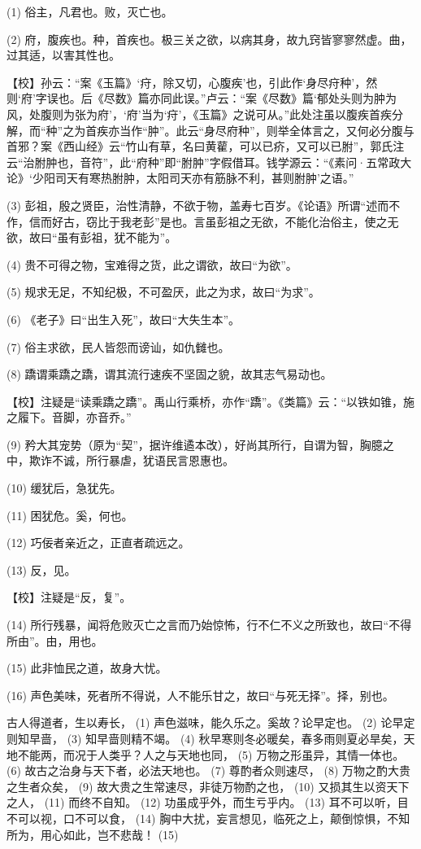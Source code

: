 \documentclass[12pt,UTF8]{ctexbook}
\begin{document}
(1) 俗主，凡君也。败，灭亡也。

(2) 府，腹疾也。种，首疾也。极三关之欲，以病其身，故九窍皆寥寥然虚。曲，过其适，以害其性也。

【校】孙云：“案《玉篇》‘疛，除又切，心腹疾’也，引此作‘身尽疛种’，然则‘府’字误也。后《尽数》篇亦同此误。”卢云：“案《尽数》篇‘郁处头则为肿为风，处腹则为张为府’，‘府’当为‘疛’，《玉篇》之说可从。”此处注虽以腹疾首疾分解，而“种”之为首疾亦当作“肿”。此云“身尽府种”，则举全体言之，又何必分腹与首邪？案《西山经》云“竹山有草，名曰黄雚，可以已疥，又可以已胕”，郭氏注云“治胕肿也，音符”，此“府种”即“胕肿”字假借耳。钱学源云：“《素问·五常政大论》‘少阳司天有寒热胕肿，太阳司天亦有筋脉不利，甚则胕肿’之语。”

(3) 彭祖，殷之贤臣，治性清静，不欲于物，盖寿七百岁。《论语》所谓“述而不作，信而好古，窃比于我老彭”是也。言虽彭祖之无欲，不能化治俗主，使之无欲，故曰“虽有彭祖，犹不能为”。

(4) 贵不可得之物，宝难得之货，此之谓欲，故曰“为欲”。

(5) 规求无足，不知纪极，不可盈厌，此之为求，故曰“为求”。

(6) 《老子》曰“出生入死”，故曰“大失生本”。

(7) 俗主求欲，民人皆怨而谤讪，如仇雠也。

(8) 蹻谓乘蹻之蹻，谓其流行速疾不坚固之貌，故其志气易动也。

【校】注疑是“读乘蹻之蹻”。禹山行乘桥，亦作“蹻”。《类篇》云：“以铁如锥，施之履下。音脚，亦音乔。”

(9) 矜大其宠势（原为“契”，据许维遹本改），好尚其所行，自谓为智，胸臆之中，欺诈不诚，所行暴虐，犹语民言恩惠也。

(10) 缓犹后，急犹先。

(11) 困犹危。奚，何也。

(12) 巧佞者亲近之，正直者疏远之。

(13) 反，见。

【校】注疑是“反，复”。

(14) 所行残暴，闻将危败灭亡之言而乃始惊怖，行不仁不义之所致也，故曰“不得所由”。由，用也。

(15) 此非恤民之道，故身大忧。

(16) 声色美味，死者所不得说，人不能乐甘之，故曰“与死无择”。择，别也。

古人得道者，生以寿长， (1) 声色滋味，能久乐之。奚故？论早定也。 (2) 论早定则知早啬， (3) 知早啬则精不竭。 (4) 秋早寒则冬必暖矣，春多雨则夏必旱矣，天地不能两，而况于人类乎？人之与天地也同， (5) 万物之形虽异，其情一体也。 (6) 故古之治身与天下者，必法天地也。 (7) 尊酌者众则速尽， (8) 万物之酌大贵之生者众矣， (9) 故大贵之生常速尽，非徒万物酌之也， (10) 又损其生以资天下之人， (11) 而终不自知。 (12) 功虽成乎外，而生亏乎内。 (13) 耳不可以听，目不可以视，口不可以食， (14) 胸中大扰，妄言想见，临死之上，颠倒惊惧，不知所为，用心如此，岂不悲哉！ (15)
\end{document}
